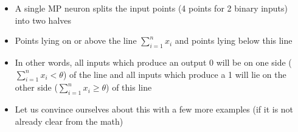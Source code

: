 \documentclass[serif, aspectratio=169]{beamer}
\begin{document}
\begin{frame}
\begin{columns}
\begin{overlayarea}{\textwidth}{\textheight}
\begin{center}
{
				}
			\end{center}
		\end{overlayarea}

		\begin{overlayarea}{\textwidth}{\textheight}
			\begin{itemize}\justifying
				\item<4-> A single MP neuron splits the input points (4 points for 2 binary inputs) into two halves
				\item<5-> Points lying on or above the line $\sum_{i=1}^{n} x_i$ and points lying below this line
				\item<6-> In other words, all inputs which produce an output 0 will be on one side ($\sum_{i=1}^{n} x_i < \theta$) of the line and all inputs which produce a 1 will lie on the other side ($\sum_{i=1}^{n} x_i \geq \theta$) of this line
				\item<7-> Let us convince ourselves about this with a few more examples (if it is not already clear from the math)
			\end{itemize}
		\end{overlayarea}
	\end{columns}
\end{frame}
\end{document}
